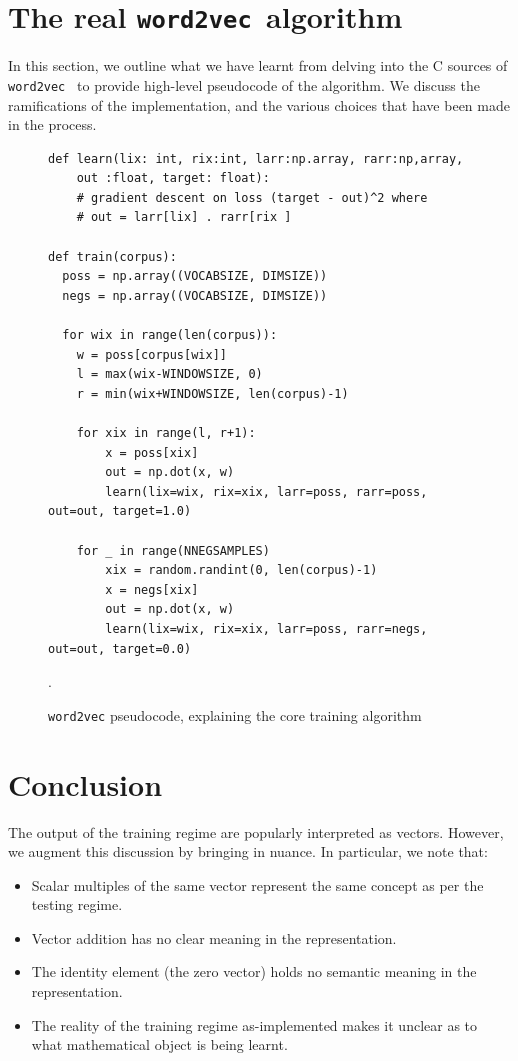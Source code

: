 \documentclass[11pt]{book}
\newcommand{\wtov}{\texttt{word2vec }}
\begin{document}
\section{The real \wtov algorithm}

In this section, we outline what we have learnt from delving into the C sources of \wtov
to provide high-level pseudocode of the algorithm. We discuss the ramifications of the
implementation, and the various choices that have been made in the process.

\begin{figure}[htb]
\begin{verbatim}
def learn(lix: int, rix:int, larr:np.array, rarr:np,array,
    out :float, target: float):
    # gradient descent on loss (target - out)^2 where
    # out = larr[lix] . rarr[rix ]

def train(corpus):
  poss = np.array((VOCABSIZE, DIMSIZE))
  negs = np.array((VOCABSIZE, DIMSIZE))

  for wix in range(len(corpus)):
    w = poss[corpus[wix]]
    l = max(wix-WINDOWSIZE, 0)
    r = min(wix+WINDOWSIZE, len(corpus)-1)

    for xix in range(l, r+1):
        x = poss[xix]
        out = np.dot(x, w)
        learn(lix=wix, rix=xix, larr=poss, rarr=poss, out=out, target=1.0)

    for _ in range(NNEGSAMPLES)
        xix = random.randint(0, len(corpus)-1)
        x = negs[xix]
        out = np.dot(x, w)
        learn(lix=wix, rix=xix, larr=poss, rarr=negs, out=out, target=0.0)
\end{verbatim}
\caption{\texttt{word2vec} pseudocode, explaining the core training algorithm}.
\label{fig:w2v-py-pseudocode} 
\end{figure}


\section{Conclusion}

The output of the training regime are popularly interpreted as vectors. However,
we augment this discussion by bringing in nuance. In particular, we note that:
\begin{itemize}
\item Scalar multiples of the same vector represent the same concept as per the testing regime.
\item Vector addition has no clear meaning in the representation.
\item The identity element (the zero vector) holds no semantic meaning in the representation.
\item The reality of the training regime as-implemented makes it unclear as to
      what mathematical object is being learnt.
\end{itemize}
\end{document}
